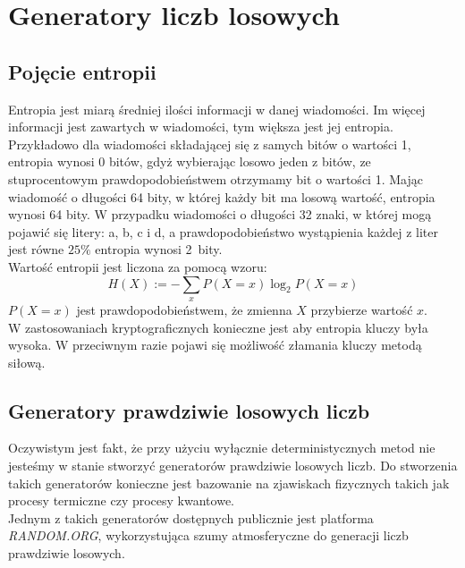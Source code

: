 \section{Generatory liczb losowych}

\subsection{Pojęcie entropii}
Entropia jest miarą średniej ilości informacji w danej wiadomości. 
Im więcej informacji jest zawartych w wiadomości, tym większa jest jej entropia. \\
Przykładowo dla wiadomości składającej się z samych bitów o wartości 1, entropia wynosi 0 bitów, gdyż wybierając 
losowo jeden z bitów, ze stuprocentowym prawdopodobieństwem otrzymamy bit o wartości 1.
Mając wiadomość o długości 64 bity, w której każdy bit ma losową wartość, entropia wynosi 64 bity.
W przypadku wiadomości o długości 32 znaki, w której mogą pojawić się litery: a, b, c i d,
a prawdopodobieństwo wystąpienia każdej z liter jest równe $25\%$ entropia wynosi 2~bity. \\
Wartość entropii jest liczona za pomocą wzoru:
$$
	H(X) := - \sum_x P(X=x) \log_2 P(X=x)
$$
$P(X=x)$ jest prawdopodobieństwem, że zmienna $X$ przybierze wartość $x$. \\
W zastosowaniach kryptograficznych konieczne jest aby entropia kluczy była wysoka. 
W przeciwnym razie pojawi się możliwość złamania kluczy metodą siłową.

\subsection{Generatory prawdziwie losowych liczb}
Oczywistym jest fakt, że przy użyciu wyłącznie deterministycznych metod nie jesteśmy w stanie stworzyć
generatorów prawdziwie losowych liczb. Do stworzenia takich generatorów konieczne jest bazowanie na 
zjawiskach fizycznych takich jak procesy termiczne czy procesy kwantowe. \\
Jednym z takich generatorów dostępnych publicznie jest platforma \textit{RANDOM.ORG}, wykorzystująca 
szumy atmosferyczne do generacji liczb prawdziwie losowych.

